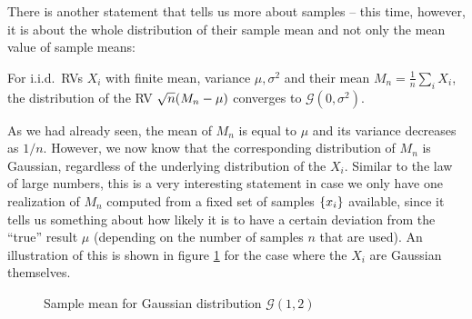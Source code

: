 There is another statement that tells us more about samples -- this time, however, it is about the whole distribution of their sample mean and not only the mean value of sample means:
\begin{prop}
For i.i.d.~RVs $X_i$ with finite mean, variance $\mu, \sigma^2$ and their mean $M_n = \frac{1}{n} \sum_i X_i$, the distribution of the RV $\sqrt{n} \qty(M_n - \mu)$ converges to $\mathcal{G}(0, \sigma^2)$.\footnotemark
\end{prop}
As we had already seen, the mean of $M_n$ is equal to $\mu$ and its variance decreases as $1 / n$. However, we now know that the corresponding distribution of $M_n$ is Gaussian, regardless of the underlying distribution of the $X_i$. Similar to the law of large numbers, this is a very interesting statement in case we only have one realization of $M_n$ computed from a fixed set of samples $\qty{x_i}$ available, since it tells us something about how likely it is to have a certain deviation from the \enquote{true} result $\mu$ (depending on the number of samples $n$ that are used). An illustration of this is shown in figure \ref{fig:central_limit} for the case where the $X_i$ are Gaussian themselves.




\begin{figure}
\centering

%
\hspace{0.04\textwidth}%
%

\caption{Sample mean for Gaussian distribution $\mathcal{G}(1, 2)$}
\label{fig:central_limit}
\end{figure}




